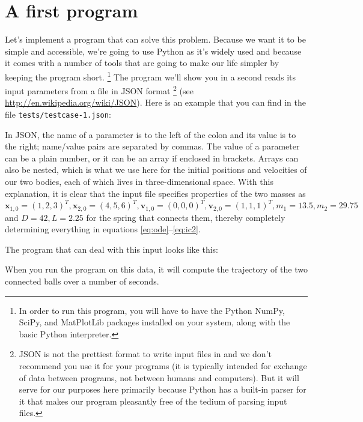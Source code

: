 \documentclass{article}
\begin{document}
\section{A first program}
\label{sec:first-steps}

Let's implement a program that can solve this problem. Because we want it
to be simple and accessible, we're going to use Python as it's widely used and
because it comes with a number of tools that are going to make our life
simpler by keeping the program short.%
\footnote{In order to run this program, you will have to have the Python
  NumPy, SciPy, and MatPlotLib packages installed on your system, along with
  the basic Python interpreter.}
The program we'll show you in a second reads its input parameters from a file in JSON format%
\footnote{JSON is not the prettiest format to write input files in and we
  don't recommend you use it for your programs (it is typically intended for
  exchange of data between programs, not between humans and computers). But it
  will serve for our purposes here primarily because Python has a built-in
  parser for it that makes our program pleasantly free of the tedium of
  parsing input files.} (see
\url{http://en.wikipedia.org/wiki/JSON}).
Here is an example that you can find in the file \texttt{tests/testcase-1.json}:

In JSON, the name of a parameter is to the left of the colon and its value is
to the right; name/value pairs are separated by commas. The value of a
parameter can be a plain number, or it can be an array if enclosed in
brackets. Arrays can also be nested, which is what we use here for the initial
positions and velocities of our two bodies, each of which lives in
three-dimensional space. With this explanation, it is clear that the input file
specifies properties of the two masses as $\mathbf x_{1,0}=(1,2,3)^T, \mathbf
x_{2,0}=(4,5,6)^T, \mathbf v_{1,0}=(0,0,0)^T, \mathbf v_{2,0}=(1,1,1)^T,
m_1=13.5, m_2=29.75$ and $D=42, L=2.25$ for the spring that connects them, 
thereby completely determining everything in equations
\eqref{eq:ode}--\eqref{eq:ic2}.

The program that can deal with this input looks like this:



When you run the program on this data, it will compute the trajectory of the
two connected balls over a number of seconds.
\end{document}
